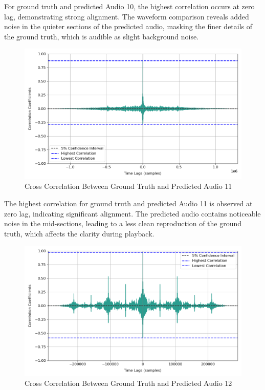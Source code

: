 \documentclass{ioereport}
\begin{document}
    For ground truth and predicted Audio 10, the highest correlation occurs at zero lag, demonstrating strong alignment. The waveform comparison reveals added noise in the quieter sections of the predicted audio, masking the finer details of the ground truth, which is audible as slight background noise.

    \begin{figure}[H]
        \centering
        \includegraphics[width=\linewidth]{assets/crosscorrelation/cross_correlation_24seconds_24secondspred.png}
        \caption{Cross Correlation Between Ground Truth and Predicted Audio 11}
        \label{fig:cross-correlation-11}
    \end{figure}

    The highest correlation for ground truth and predicted Audio 11 is observed at zero lag, indicating significant alignment. The predicted audio contains noticeable noise in the mid-sections, leading to a less clean reproduction of the ground truth, which affects the clarity during playback.

    \begin{figure}[H]
        \centering
        \includegraphics[width=\linewidth]{assets/crosscorrelation/cross_correlation_music_musicpred.png}
        \caption{Cross Correlation Between Ground Truth and Predicted Audio 12}
        \label{fig:cross-correlation-12}
    \end{figure}
\end{document}
